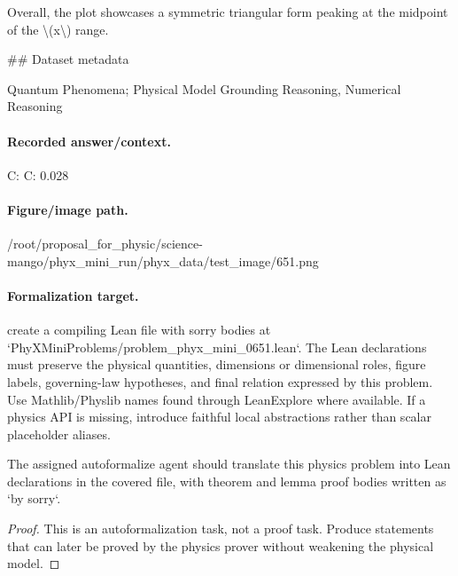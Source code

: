 Overall, the plot showcases a symmetric triangular form peaking at the midpoint of the \textbackslash{}(x\textbackslash{}) range.

\#\# Dataset metadata

Quantum Phenomena; Physical Model Grounding Reasoning, Numerical Reasoning

\paragraph{Recorded answer/context.}
C: C: 0.028

\paragraph{Figure/image path.}
/root/proposal\_for\_physic/science-mango/phyx\_mini\_run/phyx\_data/test\_image/651.png

\paragraph{Formalization target.}
create a compiling Lean file with sorry bodies at `PhyXMiniProblems/problem\_phyx\_mini\_0651.lean`. The Lean declarations must preserve the physical quantities, dimensions or dimensional roles, figure labels, governing-law hypotheses, and final relation expressed by this problem.
Use Mathlib/Physlib names found through LeanExplore where available. If a physics API is missing, introduce faithful local abstractions rather than scalar placeholder aliases.

\begin{theorem}
\label{thm:physics:phyx_mini_0651:target}
The assigned autoformalize agent should translate this physics problem into Lean declarations in the covered file, with theorem and lemma proof bodies written as `by sorry`.
\end{theorem}
\begin{proof}
This is an autoformalization task, not a proof task. Produce statements that can later be proved by the physics prover without weakening the physical model.
\end{proof}

